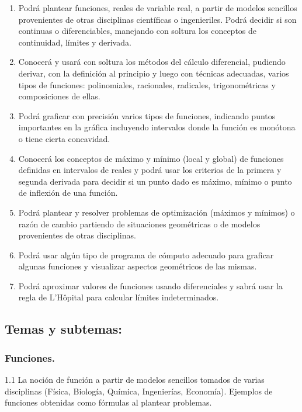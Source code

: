 \documentclass[12pt]{article}
\begin{document}
\begin{enumerate}
\def\labelenumi{\arabic{enumi}.}
\item
  Podrá plantear funciones, reales de variable real, a partir de modelos
  sencillos provenientes de otras disciplinas científicas o
  ingenieriles. Podrá decidir si son continuas o diferenciables,
  manejando con soltura los conceptos de continuidad, límites y
  derivada.
\item
  Conocerá y usará con soltura los métodos del cálculo diferencial,
  pudiendo derivar, con la definición al principio y luego con técnicas
  adecuadas, varios tipos de funciones: polinomiales, racionales,
  radicales, trigonométricas y composiciones de ellas.
\item
  Podrá graficar con precisión varios tipos de funciones, indicando
  puntos importantes en la gráfica incluyendo intervalos donde la
  función es monótona o tiene cierta concavidad.
\item
  Conocerá los conceptos de máximo y mínimo (local y global) de
  funciones definidas en intervalos de reales y podrá usar los criterios
  de la primera y segunda derivada para decidir si un punto dado es
  máximo, mínimo o punto de inflexión de una función.
\item
  Podrá plantear y resolver problemas de optimización (máximos y
  mínimos) o razón de cambio partiendo de situaciones geométricas o de
  modelos provenientes de otras disciplinas.
\item
  Podrá usar algún tipo de programa de cómputo adecuado para graficar
  algunas funciones y visualizar aspectos geométricos de las mismas.
\item
  Podrá aproximar valores de funciones usando diferenciales y sabrá usar
  la regla de L'Hôpital para calcular límites indeterminados.
\end{enumerate}

\subsection{Temas y subtemas:}\label{temas-y-subtemas}

\subsubsection{Funciones.}\label{funciones.}

1.1 La noción de función a partir de modelos sencillos tomados de varias
disciplinas (Física, Biología, Química, Ingenierías, Economía). Ejemplos
de funciones obtenidas como fórmulas al plantear problemas.
\end{document}
